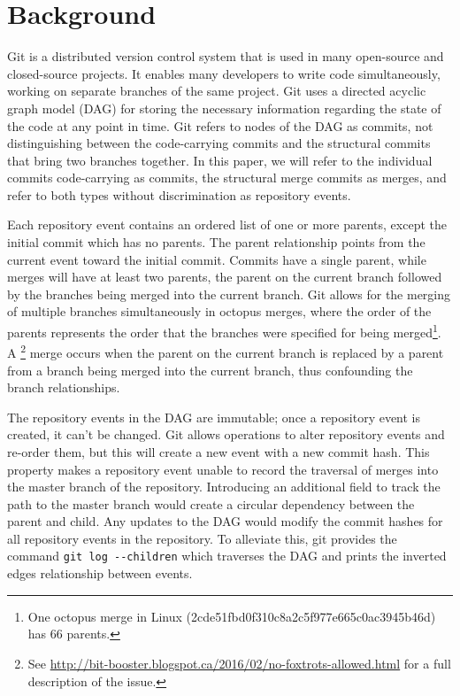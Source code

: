 
\section{Background}

Git is a distributed version control system that is used in many
open-source and closed-source projects. It enables many developers to
write code simultaneously, working on separate branches of the same
project. Git uses a directed acyclic graph model (DAG) for storing the
necessary information regarding the state of the code at any point in
time. Git refers to nodes of the DAG as commits, not distinguishing
between the code-carrying commits and the structural commits that bring
two branches together. In this paper, we will refer to the individual
commits code-carrying as commits, the structural merge commits as
merges, and refer to both types without discrimination as repository
events.

Each repository event contains an ordered list of one or more parents,
except the initial commit which has no parents. The parent relationship
points from the current event toward the initial commit.  Commits have a
single parent, while merges will have at least two parents, the parent
on the current branch followed by the branches being merged into the
current branch. Git allows for the merging of multiple branches
simultaneously in octopus merges, where the order of the parents
represents the order that the branches were specified for being merged\footnote{One octopus merge in Linux
  (2cde51fbd0f310c8a2c5f977e665c0ac3945b46d) has 66 parents.}.
A \foxtrot\footnote{See
  \url{http://bit-booster.blogspot.ca/2016/02/no-foxtrots-allowed.html}
  for a full description of the issue.} merge occurs when the parent on
the current branch is replaced by a parent from a branch being merged
into the current branch, thus confounding the branch relationships.


The repository events in the DAG are immutable; once a repository event
is created, it can't be changed. Git allows operations to alter
repository events and re-order them, but this will create a new event
with a new commit hash. This property makes a repository event unable to
record the traversal of merges into the master branch of the repository.
Introducing an additional field to track the path to the master branch
would create a circular dependency between the parent and child. Any
updates to the DAG would modify the commit hashes for all repository
events in the repository. To alleviate this, git provides the command
\verb|git log --children| which traverses the DAG and prints the
inverted edges relationship between events.

